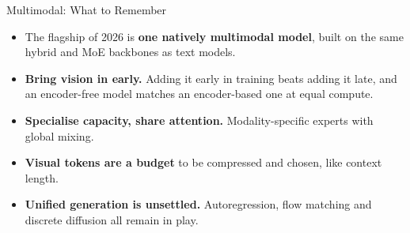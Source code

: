 \begin{frame}{Multimodal: What to Remember}
    \begin{itemize}\itemsep0.6em
        \item The flagship of 2026 is \textbf{one natively multimodal model}, built on the same hybrid and MoE backbones as text models.
        \item \textbf{Bring vision in early.} Adding it early in training beats adding it late, and an encoder-free model matches an encoder-based one at equal compute.
        \item \textbf{Specialise capacity, share attention.} Modality-specific experts with global mixing.
        \item \textbf{Visual tokens are a budget} to be compressed and chosen, like context length.
        \item \textbf{Unified generation is unsettled.} Autoregression, flow matching and discrete diffusion all remain in play.
    \end{itemize}
    \vspace{0.3em}
\end{frame}
